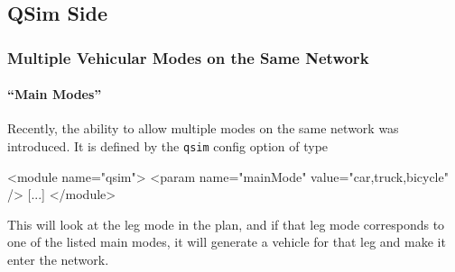 \subsection{QSim Side}
\label{sec:using-qsim-multimodal}
\subsubsection{Multiple Vehicular Modes on the Same Network}


\paragraph{\enquote{Main Modes}}
Recently, the ability to allow multiple modes on the same network was introduced.  It is defined by the \lstinline{qsim} config option of type
\begin{xml}
<module name="qsim">
   <param name="mainMode" value="car,truck,bicycle" />
   [...]
</module>
\end{xml}
This will look at the leg mode in the plan, and if that leg mode corresponds to one of the listed main modes, it will generate a vehicle for that leg and make it enter the network.

